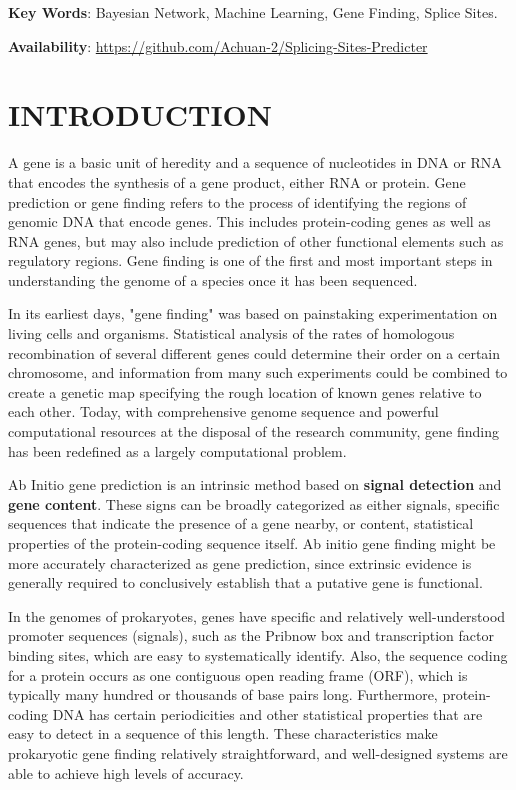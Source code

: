 \documentclass{gapd}
\begin{document}
\maketitle

\textbf{Key Words}: Bayesian Network, Machine Learning, Gene Finding, Splice Sites.

\textbf{Availability}: \href{https://github.com/Achuan-2/Splicing-Sites-Predicter}{https://github.com/Achuan-2/Splicing-Sites-Predicter}

\section{INTRODUCTION}\label{introduction}

A gene is a basic unit of heredity and a sequence of nucleotides in DNA
or RNA that encodes the synthesis of a gene product, either RNA or
protein. Gene prediction or gene finding refers to the process of
identifying the regions of genomic DNA that encode genes. This includes
protein-coding genes as well as RNA genes, but may also include
prediction of other functional elements such as regulatory regions. Gene
finding is one of the first and most important steps in understanding
the genome of a species once it has been sequenced.

In its earliest days, "gene finding" was based on painstaking
experimentation on living cells and organisms. Statistical analysis of
the rates of homologous recombination of several different genes could
determine their order on a certain chromosome, and information from many
such experiments could be combined to create a genetic map specifying
the rough location of known genes relative to each other. Today, with
comprehensive genome sequence and powerful computational resources at
the disposal of the research community, gene finding has been redefined
as a largely computational problem.

Ab Initio gene prediction is an intrinsic method based on \textbf{signal
detection} and \textbf{gene content}. These signs can be broadly
categorized as either signals, specific sequences that indicate the
presence of a gene nearby, or content, statistical properties of the
protein-coding sequence itself. Ab initio gene finding might be more
accurately characterized as gene prediction, since extrinsic evidence is
generally required to conclusively establish that a putative gene is
functional.

In the genomes of prokaryotes, genes have specific and relatively
well-understood promoter sequences (signals), such as the Pribnow box
and transcription factor binding sites, which are easy to systematically
identify. Also, the sequence coding for a protein occurs as one
contiguous open reading frame (ORF), which is typically many hundred or
thousands of base pairs long. Furthermore, protein-coding DNA has
certain periodicities and other statistical properties that are easy to
detect in a sequence of this length. These characteristics make
prokaryotic gene finding relatively straightforward, and well-designed
systems are able to achieve high levels of accuracy.
\end{document}
